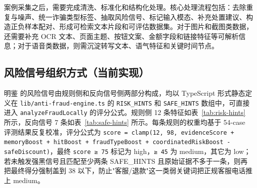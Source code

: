 \documentclass[UTF8,a4paper,12pt]{ctexart}
\begin{document}
案例采集之后，需要完成清洗、标准化和结构化处理。核心处理流程包括：去除重复与噪声、统一诈骗类型标签、抽取风险信号、标记输入模态、补充处置建议、构造正负样本配对、形成可检索文本片段和可评估数据集。对于图片和截图类数据，还需要补充 OCR 文本、页面主题、按钮文案、金额字段和链接特征等可解析信息；对于语音类数据，则需沉淀转写文本、语气特征和关键时间节点。

\subsection{风险信号组织方式（当前实现）}

明鉴 的风险信号由规则侧和反向信号侧两部分构成，均以 TypeScript 形式静态定义在 \texttt{lib/anti-fraud-engine.ts} 的 \texttt{RISK\_HINTS} 和 \texttt{SAFE\_HINTS} 数组中，可直接进入 \texttt{analyzeFraudLocally} 的评分公式。规则侧 12 条特征如表~\ref{tab:risk-hints} 所示，反向信号 7 条如表~\ref{tab:safe-hints} 所示。每条规则的权重均基于 54-case 评测结果反复校准，评分公式为 \texttt{score = clamp(12, 98, evidenceScore + memoryBoost + hitBoost + fraudTypeBoost + coordinatedRiskBoost - safeDiscount)}，最终 \texttt{score ≥ 75} 标记为 high，\texttt{≥ 45} 为 medium，其它为 low；若未触发强黑信号且匹配至少两条 SAFE\_HINTS 且原始证据不多于一条，则再把最终得分强制盖到 38 以下，防止"客服/退款"这一类弱关键词把正规客服电话推上 medium。
\end{document}
